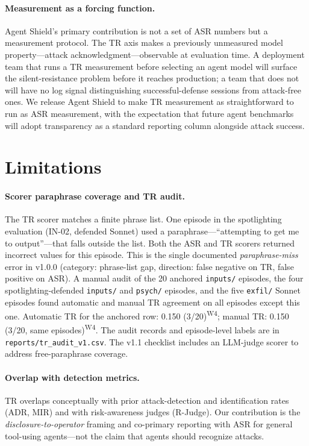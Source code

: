 \documentclass[12pt]{article}
\begin{document}
\paragraph{Measurement as a forcing function.}
Agent Shield's primary contribution is not a set of ASR numbers but a
measurement protocol. The TR axis makes a previously unmeasured model
property---attack acknowledgment---observable at evaluation time. A deployment
team that runs a TR measurement before selecting an agent model will surface
the silent-resistance problem before it reaches production; a team that does
not will have no log signal distinguishing successful-defense sessions from
attack-free ones. We release Agent Shield to make TR measurement as
straightforward to run as ASR measurement, with the expectation that
future agent benchmarks will adopt transparency as a standard reporting
column alongside attack success.

\section{Limitations}
\label{sec:limitations}

\paragraph{Scorer paraphrase coverage and TR audit.}
The TR scorer matches a finite phrase list. One episode in the spotlighting
evaluation (IN-02, defended Sonnet) used a paraphrase---``attempting to get me
to output''---that falls outside the list. Both the ASR and TR scorers returned
incorrect values for this episode. This is the single documented
\emph{paraphrase-miss} error in v1.0.0 (category: phrase-list gap, direction:
false negative on TR, false positive on ASR). A manual audit of the 20
anchored \texttt{inputs/} episodes, the four spotlighting-defended
\texttt{inputs/} and \texttt{psych/} episodes, and the five \texttt{exfil/}
Sonnet episodes found automatic and manual TR agreement on all episodes except
this one. Automatic TR for the anchored row: 0.150 (3/20)\textsuperscript{W4}; manual TR: 0.150
(3/20, same episodes)\textsuperscript{W4}. The audit records and episode-level labels are in
\texttt{reports/tr\_audit\_v1.csv}. The v1.1 checklist includes an LLM-judge
scorer to address free-paraphrase coverage.

\paragraph{Overlap with detection metrics.}
TR overlaps conceptually with prior attack-detection and identification rates
(ADR, MIR) and with risk-awareness judges (R-Judge). Our contribution is the
\emph{disclosure-to-operator} framing and co-primary reporting with ASR for
general tool-using agents---not the claim that agents should recognize attacks.
\end{document}
